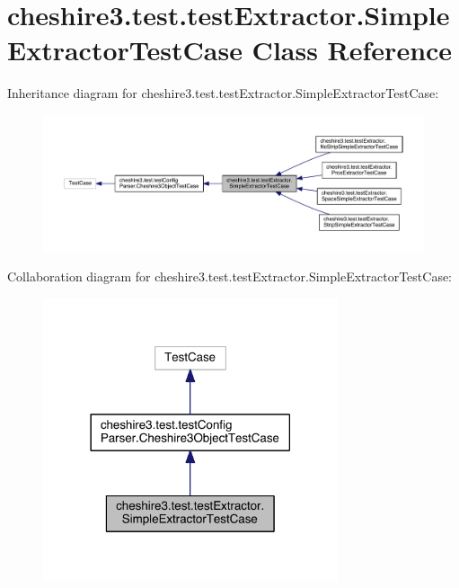 \hypertarget{classcheshire3_1_1test_1_1test_extractor_1_1_simple_extractor_test_case}{\section{cheshire3.\-test.\-test\-Extractor.\-Simple\-Extractor\-Test\-Case Class Reference}
\label{classcheshire3_1_1test_1_1test_extractor_1_1_simple_extractor_test_case}
}


Inheritance diagram for cheshire3.\-test.\-test\-Extractor.\-Simple\-Extractor\-Test\-Case\-:
\nopagebreak
\begin{figure}[H]
\begin{center}
\leavevmode
\includegraphics[width=350pt]{classcheshire3_1_1test_1_1test_extractor_1_1_simple_extractor_test_case__inherit__graph}
\end{center}
\end{figure}


Collaboration diagram for cheshire3.\-test.\-test\-Extractor.\-Simple\-Extractor\-Test\-Case\-:
\nopagebreak
\begin{figure}[H]
\begin{center}
\leavevmode
\includegraphics[width=246pt]{classcheshire3_1_1test_1_1test_extractor_1_1_simple_extractor_test_case__coll__graph}
\end{center}
\end{figure}

